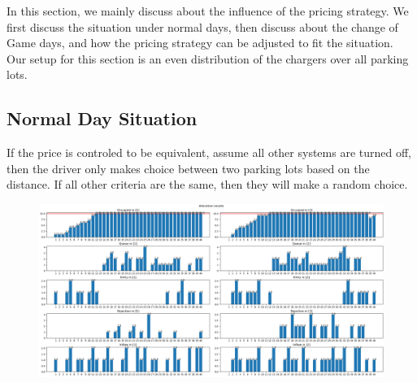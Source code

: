 In this section, we mainly discuss about the influence of the pricing strategy. We first discuss the situation under normal days, then discuss about the change of Game days, and how the pricing strategy can be adjusted to fit the situation. Our setup for this section is an even distribution of the chargers over all parking lots.

\subsection{Normal Day Situation}
If the price is controled to be equivalent, assume all other systems are turned off, then the driver only makes choice between two parking lots based on the distance. If all other criteria are the same, then they will make a random choice. 

\begin{figure}
    \centering
    \includegraphics[width=\textwidth]{figure/price_scenario/all_clean.png}
\end{figure}
